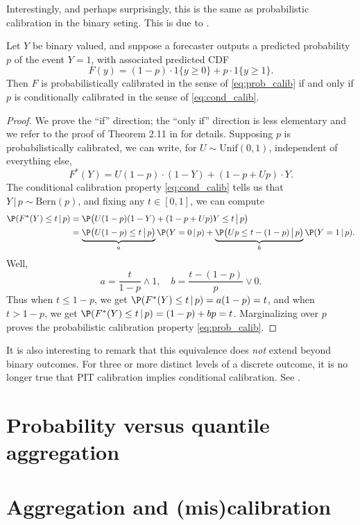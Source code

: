 \documentclass{article}
\begin{document}
Interestingly, and perhaps surprisingly, this is the same as probabilistic
calibration in the binary seting. This is due to \citet{gneiting2013combining}. 

\begin{theorem}
Let $Y$ be binary valued, and suppose a forecaster outputs a predicted
probability $p$ of the event $Y = 1$, with associated predicted CDF 
\[
F(y) = (1-p) \cdot 1\{y \geq 0\} +  p \cdot 1\{y \geq 1\}.
\]
Then $F$ is probabilistically calibrated in the sense of \eqref{eq:prob_calib}
if and only if $p$ is conditionally calibrated in the sense of
\eqref{eq:cond_calib}. 
\end{theorem}

\begin{proof}
We prove the ``if'' direction; the ``only if'' direction is less elementary and 
we refer to the proof of Theorem 2.11 in \citet{gneiting2013combining} for
details. Supposing $p$ is probabilistically calibrated, we can write, for $U
\sim \mathrm{Unif}(0,1)$, independent of everything else, 
\[
F^*(Y) = U (1-p) \cdot (1-Y) + (1-p + U p) \cdot Y.
\]
The conditional calibration property \eqref{eq:cond_calib} tells us that
$Y\,|\,p \sim \mathrm{Bern}(p)$, and fixing any $t \in [0,1]$, we can compute   
\begin{align*}
\P(F^*(Y) \leq t \,|\, p) 
&= \P\big(U (1-p) (1-Y) + (1-p + U p) Y \leq t \,\big|\, p \big) \\
&= \underbrace{\P\big(U (1-p) \leq t \,\big|\, p \big)}_{a} \P( Y=0 \,|\, p) +  
\underbrace{\P\big(U p \leq t-(1-p) \,\big|\, p \big)}_{b} \P( Y=1 \,|\, p).
\end{align*}
Well, 
\[
a = \frac{t}{1-p} \wedge 1, 
\quad
b = \frac{t-(1-p)}{p} \vee 0.
\]
Thus when $t \leq 1-p$, we get $\P(F^*(Y) \leq t \,|\, p) = a(1-p) = t$, and
when $t > 1-p$, we get $\P(F^*(Y) \leq t \,|\, p) = (1-p) + bp =
t$. Marginalizing over $p$ proves the probabilistic calibration property
\eqref{eq:prob_calib}.  
\end{proof}

It is also interesting to remark that this equivalence does \emph{not} extend
beyond binary outcomes. For three or more distinct levels of a discrete outcome,
it is no longer true that PIT calibration implies conditional calibration. See 
\citet{gneiting2022regression}.

\section{Probability versus quantile aggregation}
\label{sec:prob_vs_quant}

\section{Aggregation and (mis)calibration}



\end{document}
